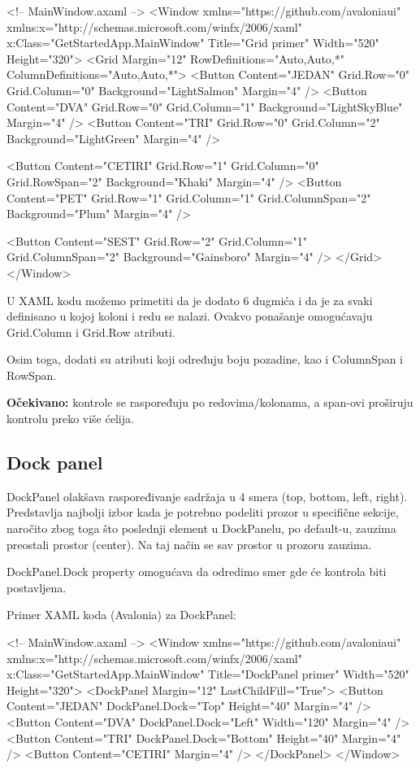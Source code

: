 \documentclass[11pt,a4paper]{article}
\begin{document}
\begin{CodeBlock}
<!-- MainWindow.axaml -->
<Window xmlns="https://github.com/avaloniaui"
        xmlns:x="http://schemas.microsoft.com/winfx/2006/xaml"
        x:Class="GetStartedApp.MainWindow"
        Title="Grid primer" Width="520" Height="320">
  <Grid Margin="12" RowDefinitions="Auto,Auto,*" ColumnDefinitions="Auto,Auto,*">
    <Button Content="JEDAN" Grid.Row="0" Grid.Column="0" Background="LightSalmon" Margin="4" />
    <Button Content="DVA" Grid.Row="0" Grid.Column="1" Background="LightSkyBlue" Margin="4" />
    <Button Content="TRI" Grid.Row="0" Grid.Column="2" Background="LightGreen" Margin="4" />

    <Button Content="CETIRI" Grid.Row="1" Grid.Column="0" Grid.RowSpan="2" Background="Khaki" Margin="4" />
    <Button Content="PET" Grid.Row="1" Grid.Column="1" Grid.ColumnSpan="2" Background="Plum" Margin="4" />

    <Button Content="SEST" Grid.Row="2" Grid.Column="1" Grid.ColumnSpan="2" Background="Gainsboro" Margin="4" />
  </Grid>
</Window>
\end{CodeBlock}

U XAML kodu možemo primetiti da je dodato 6 dugmića i da je za svaki definisano u kojoj koloni i redu se nalazi. Ovakvo ponašanje omogućavaju Grid.Column i Grid.Row atributi.

Osim toga, dodati su atributi koji određuju boju pozadine, kao i ColumnSpan i RowSpan.

\textbf{Očekivano:} kontrole se raspoređuju po redovima/kolonama, a span-ovi proširuju kontrolu preko više ćelija.

\subsection{Dock panel}
DockPanel olakšava raspoređivanje sadržaja u 4 smera (top, bottom, left, right). Predstavlja najbolji izbor kada je potrebno podeliti prozor u specifične sekcije, naročito zbog toga što poslednji element u DockPanelu, po default-u, zauzima preostali prostor (center). Na taj način se sav prostor u prozoru zauzima.

DockPanel.Dock property omogućava da odredimo smer gde će kontrola biti postavljena.

Primer XAML koda (Avalonia) za DockPanel:

\begin{CodeBlock}
<!-- MainWindow.axaml -->
<Window xmlns="https://github.com/avaloniaui"
        xmlns:x="http://schemas.microsoft.com/winfx/2006/xaml"
        x:Class="GetStartedApp.MainWindow"
        Title="DockPanel primer" Width="520" Height="320">
  <DockPanel Margin="12" LastChildFill="True">
    <Button Content="JEDAN" DockPanel.Dock="Top" Height="40" Margin="4" />
    <Button Content="DVA" DockPanel.Dock="Left" Width="120" Margin="4" />
    <Button Content="TRI" DockPanel.Dock="Bottom" Height="40" Margin="4" />
    <Button Content="CETIRI" Margin="4" />
  </DockPanel>
</Window>
\end{CodeBlock}
\end{document}
